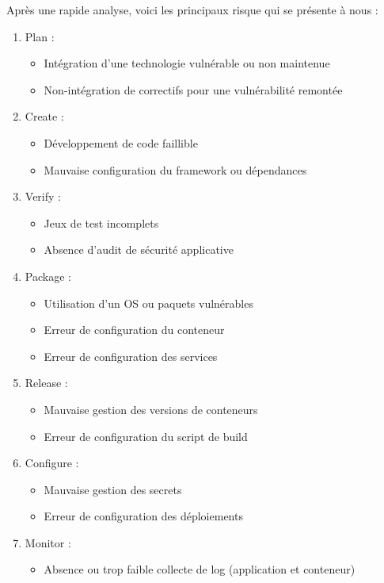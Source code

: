 Après une rapide analyse, voici les principaux risque qui se présente à nous :
\begin{multicols}{2}
    \begin{enumerate}
        \item Plan :
        \begin{itemize}
            \item Intégration d'une technologie vulnérable ou non maintenue
            \item Non-intégration de correctifs pour une vulnérabilité remontée
        \end{itemize}
        \item Create :
        \begin{itemize}
            \item Développement de code faillible
            \item Mauvaise configuration du framework ou dépendances
        \end{itemize}
        \item Verify :
        \begin{itemize}
            \item Jeux de test incomplets
            \item Absence d'audit de sécurité applicative
        \end{itemize}
        \item Package :
        \begin{itemize}
            \item Utilisation d'un OS ou paquets vulnérables
            \columnbreak
            \item Erreur de configuration du conteneur
            \item Erreur de configuration des services
        \end{itemize}
        \item Release :
        \begin{itemize}
            \item Mauvaise gestion des versions de conteneurs
            \item Erreur de configuration du script de build
        \end{itemize}
        \item Configure :
        \begin{itemize}
            \item Mauvaise gestion des secrets
            \item Erreur de configuration des déploiements
        \end{itemize}
        \item Monitor :
        \begin{itemize}
            \item Absence ou trop faible collecte de log (application et conteneur)
        \end{itemize}
    \end{enumerate}
\end{multicols}

